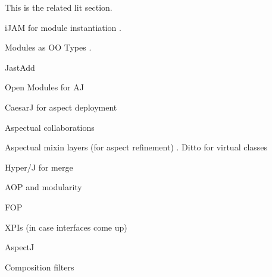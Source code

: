 This is the related lit section.

iJAM for module instantiation \cite{iJAM}.

Modules as OO Types \cite{modulesastypes}.

JastAdd \cite{jastadd}

Open Modules for AJ \cite{openmodulesaj}

CaesarJ for aspect deployment \cite{caesarj}

Aspectual collaborations \cite{lieberherr03aspectual}

Aspectual mixin layers (for aspect refinement) \cite{aspectualmixinlayers}.
Ditto for virtual classes \cite{virtualclasses89}

Hyper/J for merge \cite{hyperj}

AOP and modularity \cite{aopmodularreasoning}

FOP \cite{fopstepwiserefinement}

XPIs (in case interfaces come up) \cite{xpi}

AspectJ \cite{overviewaspectj}

Composition filters \cite{compositionfilters}